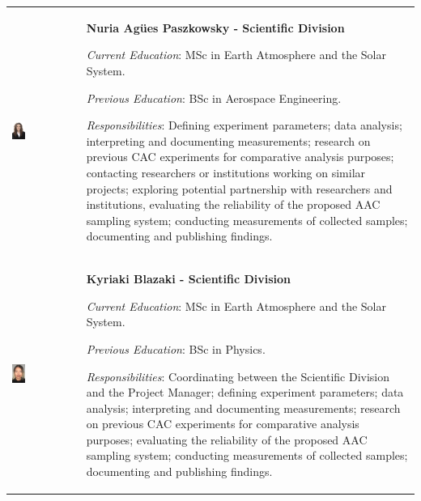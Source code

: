 \documentclass[a4paper,12pt,twoside]{article}
\begin{document}
\begin{longtable}[]{m{} m{}}
\includegraphics[width=0.2\textwidth]{1-introduction/img/agues-paszkowsky.jpg} & \textbf{Nuria Agües Paszkowsky - Scientific Division}

\smallskip
\textit{Current Education}: MSc in Earth Atmosphere and the Solar System.

\smallskip
\textit{Previous Education}: BSc in Aerospace Engineering.

\smallskip
\textit{Responsibilities}: Defining experiment parameters; data analysis; interpreting and documenting measurements; research on previous CAC experiments for comparative analysis purposes; contacting researchers or institutions working on similar projects; exploring potential partnership with researchers and institutions, evaluating the reliability of the proposed AAC sampling system; conducting measurements of collected samples; documenting and publishing findings. 
\bigskip
\\

\includegraphics[width=0.2\textwidth]{1-introduction/img/kiki-blazaki.jpg} & \textbf{Kyriaki Blazaki - Scientific Division}

\smallskip
\textit{Current Education}: MSc in Earth Atmosphere and the Solar System.

\smallskip
\textit{Previous Education}: BSc in Physics.


\smallskip
\textit{Responsibilities}: Coordinating between the Scientific Division and the Project Manager; defining experiment parameters; data analysis; interpreting and documenting measurements; research on previous CAC experiments for comparative analysis purposes; evaluating the reliability of the proposed AAC sampling system; conducting measurements of collected samples; documenting and publishing findings. 
\bigskip
\\


\end{longtable}
\end{document}
